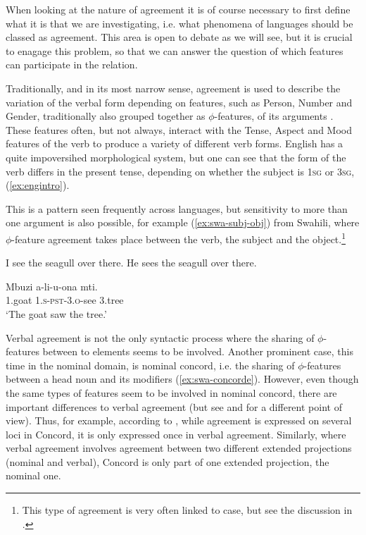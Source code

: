 \documentclass[output=paper
,modfonts
,nonflat]{langsci/langscibook}
\begin{document}
When looking at the nature of agreement it is of course necessary to first define what it is that we are investigating, i.e. what phenomena of languages should be classed as agreement. This area is open to debate as we will see, but it is crucial to enagage this problem, so that we can answer the question of which features can participate in the {\agr} relation.

Traditionally, and in its most narrow sense, agreement is used to describe the variation of the verbal form depending on features, such as Person, Number and Gender, traditionally also grouped together as $\phi$-fea\-tures, of its arguments \citep{preminger2015}.
These features often, but not always, interact with the Tense, Aspect and Mood features of the verb to produce a variety of different verb forms.
English has a quite impoversihed morphological system, but one can see that the form of the verb differs in the present tense, depending on whether the subject is \textsc{1sg} or \textsc{3sg}, (\ref{ex:engintro}).

This is a pattern seen frequently across languages, but sensitivity to more than one argument is also possible, for example (\ref{ex:swa-subj-obj}) from Swahili, where $\phi$-feature agreement takes place between the verb, the subject and the object.\footnote{This type of agreement is very often linked to case, but see the discussion in .}

\begin{exe}
	\ex \label{ex:engintro}
	\begin{xlist}
		\ex I see the seagull over there.
		\ex He sees the seagull over there.
	\end{xlist}
\end{exe}

\begin{exe}
	\ex \label{ex:swa-subj-obj} 
	\gll Mbuzi a-li-u-ona mti.\\
	1.goat \textsc{1.s-pst-3.o}-see 3.tree\\
	\glt `The goat saw the tree.'
	
\end{exe}
Verbal agreement is not the only syntactic process where the sharing of $\phi$-fea\-tures between to elements seems to be involved.
Another prominent case, this time in the nominal domain, is nominal concord, i.e. the sharing of $\phi$-fea\-tures between a head noun and its modifiers (\ref{ex:swa-concorde}).
However, even though the same types of features seem to be involved in nominal concord, there are important differences to verbal agreement (but see \citealt{Carstens2001} and \citealt{Baker2008a} for a different point of view). Thus, for example, according to \citet[][7]{Norris2014}, while agreement is expressed on several loci in Concord, it is only expressed once in verbal agreement. Similarly, where verbal agreement involves agreement between two different extended projections (nominal and verbal), Concord is only part of one extended projection, the nominal one.
\end{document}
